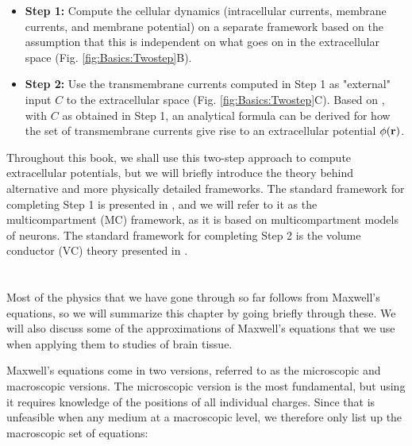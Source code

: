 \begin{itemize}
\item {\bf Step 1:} Compute the cellular dynamics (intracellular currents, membrane currents, and membrane potential) on a separate framework based on the assumption that this is independent on what goes on in the extracellular space (Fig. \ref{fig:Basics:Twostep}B). 

\item {\bf Step 2:} Use the transmembrane currents computed in Step 1 as "external" input $C$ to the extracellular space (Fig. \ref{fig:Basics:Twostep}C). Based on , with $C$ as obtained in Step 1, an analytical formula can be derived for how the set of transmembrane currents give rise to an extracellular potential $\phi({\bf r})$. 
\end{itemize}

Throughout this book, we shall use this two-step approach to compute extracellular potentials, but we will briefly introduce the theory behind alternative and more physically detailed frameworks. The standard framework for completing Step 1 is presented in , and we will refer to it as the multicompartment (MC) framework, as it is based on multicompartment models of neurons. The standard framework for completing Step 2 is the volume conductor (VC) theory presented in  . 


\section{}
\label{sec:Basics:Maxwell} 
Most of the physics that we have gone through so far follows from Maxwell's equations, so we will summarize this chapter by going briefly through these. We will also discuss some of the approximations of Maxwell's equations that we use when applying them to studies of brain tissue. 

Maxwell's equations come in two versions, referred to as the microscopic and macroscopic versions. The microscopic version is the most fundamental, but using it requires knowledge of the positions of all individual charges. Since that is unfeasible when any medium at a macroscopic level, we therefore only list up the macroscopic set of equations: 

